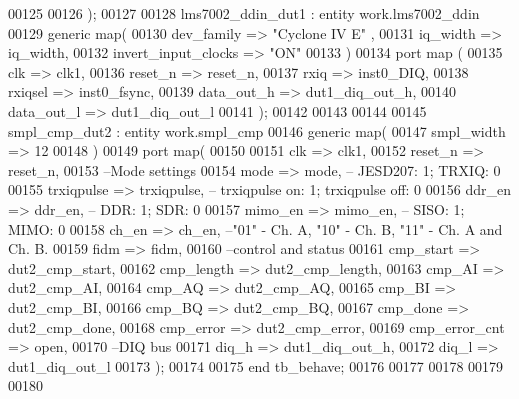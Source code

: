 \begin{DoxyCode}
00125     
00126     \textcolor{vhdlchar}{)};
00127     
00128     lms7002\_ddin\_dut1 : \textcolor{keywordflow}{entity} work.lms7002_ddin
00129     \textcolor{keywordflow}{generic} \textcolor{keywordflow}{map}( 
00130       dev_family                => \textcolor{keyword}{"Cyclone IV E"}  ,
00131       iq_width                  => iq_width,
00132       invert_input_clocks   => \textcolor{keyword}{"ON"}
00133     \textcolor{vhdlchar}{)}
00134     \textcolor{keywordflow}{port} \textcolor{keywordflow}{map} (
00135       clk           => clk1,
00136       reset_n       => reset_n, 
00137         rxiq            => inst0_DIQ, 
00138         rxiqsel     => inst0_fsync, 
00139         data_out_h  => dut1_diq_out_h, 
00140         data_out_l  => dut1_diq_out_l 
00141         \textcolor{vhdlchar}{)};
00142    
00143     
00144   
00145 smpl\_cmp\_dut2 : \textcolor{keywordflow}{entity} work.smpl_cmp
00146    \textcolor{keywordflow}{generic} \textcolor{keywordflow}{map}(
00147       smpl_width   =>  \textcolor{vhdllogic}{12}
00148    \textcolor{vhdlchar}{)}
00149    \textcolor{keywordflow}{port} \textcolor{keywordflow}{map}(
00150 
00151       clk            => clk1,
00152       reset_n        => reset_n,
00153 \textcolor{keyword}{      --Mode settings}
00154       mode             => mode,\textcolor{keyword}{ -- JESD207: 1; TRXIQ: 0}
00155         trxiqpulse     => trxiqpulse,\textcolor{keyword}{ -- trxiqpulse on: 1; trxiqpulse off: 0}
00156         ddr_en         => ddr_en,\textcolor{keyword}{ -- DDR: 1; SDR: 0}
00157         mimo_en        => mimo_en,\textcolor{keyword}{ -- SISO: 1; MIMO: 0}
00158         ch_en              => ch_en,\textcolor{keyword}{ --"01" - Ch. A, "10" - Ch. B, "11" - Ch. A and Ch. B.}
00159       fidm             => fidm,
00160 \textcolor{keyword}{      --control and status}
00161       cmp_start      => dut2_cmp_start,
00162       cmp_length     => dut2_cmp_length,
00163       cmp_AI         => dut2_cmp_AI,
00164       cmp_AQ         => dut2_cmp_AQ,
00165       cmp_BI         => dut2_cmp_BI,
00166       cmp_BQ         => dut2_cmp_BQ,
00167       cmp_done       => dut2_cmp_done,
00168       cmp_error      => dut2_cmp_error,
00169       cmp_error_cnt  => \textcolor{keywordflow}{open},
00170 \textcolor{keyword}{      --DIQ bus}
00171       diq_h          => dut1_diq_out_h,
00172       diq_l          => dut1_diq_out_l          
00173         \textcolor{vhdlchar}{)};
00174     
00175     \textcolor{keywordflow}{end} \textcolor{vhdlchar}{tb\_behave};
00176   
00177   
00178 
00179 
00180   
\end{DoxyCode}
